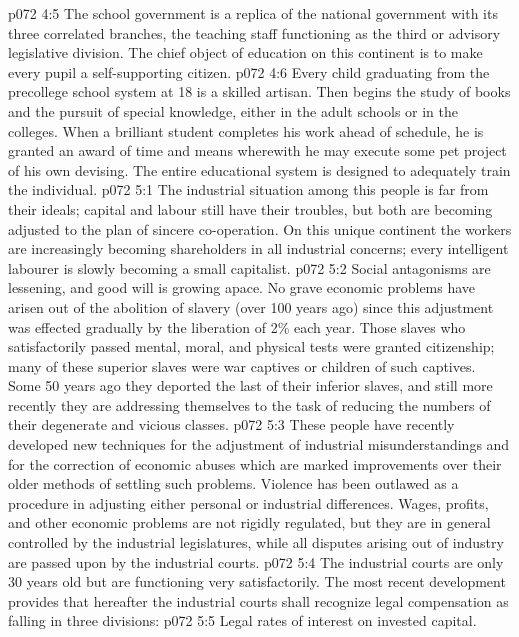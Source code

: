 \vs p072 4:5 The school government is a replica of the national government with its three correlated branches, the teaching staff functioning as the third or advisory legislative division. The chief object of education on this continent is to make every pupil a self\hyp{}supporting citizen.
\vs p072 4:6 Every child graduating from the precollege school system at 18 is a skilled artisan. Then begins the study of books and the pursuit of special knowledge, either in the adult schools or in the colleges. When a brilliant student completes his work ahead of schedule, he is granted an award of time and means wherewith he may execute some pet project of his own devising. The entire educational system is designed to adequately train the individual.
\vs p072 5:1 The industrial situation among this people is far from their ideals; capital and labour still have their troubles, but both are becoming adjusted to the plan of sincere co\hyp{}operation. On this unique continent the workers are increasingly becoming shareholders in all industrial concerns; every intelligent labourer is slowly becoming a small capitalist.
\vs p072 5:2 Social antagonisms are lessening, and good will is growing apace. No grave economic problems have arisen out of the abolition of slavery (over 100 years ago) since this adjustment was effected gradually by the liberation of 2\% each year. Those slaves who satisfactorily passed mental, moral, and physical tests were granted citizenship; many of these superior slaves were war captives or children of such captives. Some 50 years ago they deported the last of their inferior slaves, and still more recently they are addressing themselves to the task of reducing the numbers of their degenerate and vicious classes.
\vs p072 5:3 \pc These people have recently developed new techniques for the adjustment of industrial misunderstandings and for the correction of economic abuses which are marked improvements over their older methods of settling such problems. Violence has been outlawed as a procedure in adjusting either personal or industrial differences. Wages, profits, and other economic problems are not rigidly regulated, but they are in general controlled by the industrial legislatures, while all disputes arising out of industry are passed upon by the industrial courts.
\vs p072 5:4 The industrial courts are only 30 years old but are functioning very satisfactorily. The most recent development provides that hereafter the industrial courts shall recognize legal compensation as falling in three divisions:
\vs p072 5:5 \bibnobreakspace Legal rates of interest on invested capital.
